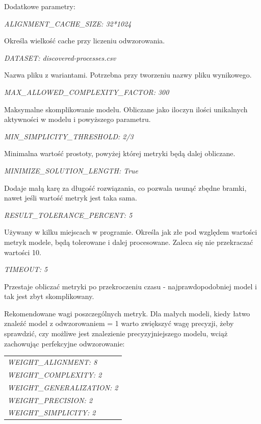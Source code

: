 Dodatkowe parametry: \newline
\begin{center}
\textit{ALIGNMENT\_CACHE\_SIZE:           32*1024}
\end{center}
Określa wielkość cache przy liczeniu odwzorowania.
\begin{center}
\textit{DATASET:                        discovered-processes.csv}
\end{center}
Nazwa pliku z wariantami. Potrzebna przy tworzeniu nazwy pliku wynikowego.
\begin{center}
\textit{MAX\_ALLOWED\_COMPLEXITY\_FACTOR:  300}
\end{center}
Maksymalne skomplikowanie modelu. Obliczane jako iloczyn ilości unikalnych aktywności w modelu i powyższego parametru.
\begin{center}
\textit{MIN\_SIMPLICITY\_THRESHOLD:       2/3}
\end{center}
Minimalna wartość prostoty, powyżej której metryki będą dalej obliczane. 
\begin{center}
\textit{MINIMIZE\_SOLUTION\_LENGTH:       True}
\end{center}
Dodaje małą karę za długość rozwiązania, co pozwala usunąć zbędne bramki, nawet jeśli wartość metryk jest taka sama.
\begin{center}
\textit{RESULT\_TOLERANCE\_PERCENT:       5}
\end{center}
Używany w kilku miejscach w programie. Określa jak złe pod względem wartości metryk modele, będą tolerowane i dalej procesowane. Zaleca się nie przekraczać wartości 10.
\begin{center}
\textit{TIMEOUT:                        5}
\end{center}
Przestaje obliczać metryki po przekroczeniu czasu - najprawdopodobniej model i tak jest zbyt skomplikowany.

Rekomendowane wagi poszczególnych metryk. Dla małych modeli, kiedy łatwo znaleźć model z odwzorowaniem = 1 warto zwiększyć wagę precyzji, żeby sprawdzić, czy możliwe jest znalezienie precyzyjniejszego modelu, wciąż zachowując perfekcyjne odwzorowanie: 
 \begin{center}
  \begin{tabular}{l}
    \textit{WEIGHT\_ALIGNMENT:              8} \\
	\textit{WEIGHT\_COMPLEXITY:              2} \\
	\textit{WEIGHT\_GENERALIZATION:          2} \\
	\textit{WEIGHT\_PRECISION:               2} \\
	\textit{WEIGHT\_SIMPLICITY:              2}
  \end{tabular}
 \end{center}


